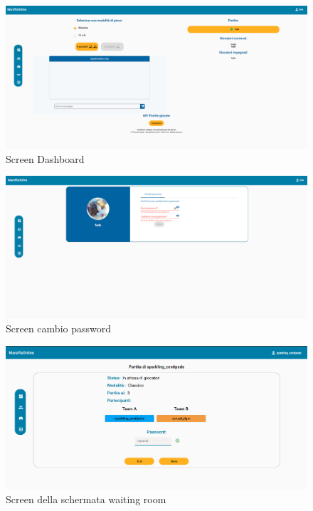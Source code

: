 \begin{figure}[h!]
    \centering 
    \includegraphics[scale=0.45]{report/img/dashboard.png}
    \caption{Screen Dashboard}
    \label{screen}
\end{figure}
\begin{figure}[h!]
    \centering 
    \includegraphics[scale=0.45]{report/img/changePWD.png}
    \caption{Screen cambio password}
    \label{screen}
\end{figure}
\begin{figure}[h!]
    \centering 
    \includegraphics[scale=0.35]{report/img/waiting_room.png}
    \caption{Screen della schermata waiting room}
    \label{screen}
\end{figure}
